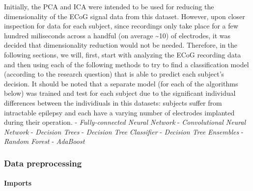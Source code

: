 \documentclass[11pt]{article}
\begin{document}
    Initially, the PCA and ICA were intended to be used for reducing the
dimensionality of the ECoG signal data from this dataset. However, upon
closer inspection for data for each subject, since recordings only take
place for a few hundred miliseconds across a handful (on average
\textasciitilde{}10) of electrodes, it was decided that dimensionality
reduction would not be needed. Therefore, in the following sections, we
will, first, start with analyzing the ECoG recording data and then using
each of the following methods to try to find a classification model
(according to the research question) that is able to predict each
subject's decision. It should be noted that a separate model (for each
of the algorithms below) was trained and test for each subject due to
the significant individual differences between the individiuals in this
datasets: subjects suffer from intractable epilepsy and each have a
varying number of electrodes implanted during their operation. -
\emph{Fully-connected Neural Network} - \emph{Convolutional Neural
Network} - \emph{Decision Trees} - \emph{Decision Tree Classifier} -
\emph{Decision Tree Ensembles} - \emph{Random Forest} - \emph{AdaBoost}

    \hypertarget{data-preprocessing}{%
\subsubsection{Data preprocessing}\label{data-preprocessing}}

    \hypertarget{imports}{%
\paragraph{Imports}\label{imports}}
\end{document}
